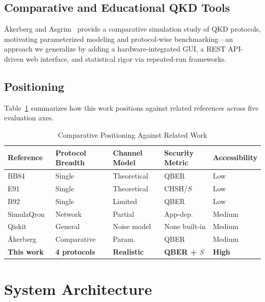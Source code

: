 \documentclass[journal]{IEEEtran}
\begin{document}
\subsection{Comparative and Educational QKD Tools}

\AA kerberg and Asgrim~\cite{akerberg2023} provide a comparative
simulation study of QKD protocols, motivating parameterized modeling
and protocol-wise benchmarking—an approach we generalize by adding
a hardware-integrated GUI, a REST API-driven web interface, and
statistical rigor via repeated-run frameworks.

\subsection{Positioning}

Table~\ref{tab:litcompare} summarizes how this work positions against
related references across five evaluation axes.

\begin{table}[!t]
  \caption{Comparative Positioning Against Related Work}
  \label{tab:litcompare}
  \centering
  \footnotesize
  \begin{tabular}{p{1.4cm}p{1.1cm}p{1.2cm}p{1.2cm}p{1.3cm}}
    \toprule
    Reference & Protocol Breadth & Channel Model & Security Metric & Accessibility \\
    \midrule
    BB84~\cite{bb84}           & Single  & Theoretical & QBER       & Low    \\
    E91~\cite{e91}             & Single  & Theoretical & CHSH/$S$   & Low    \\
    B92~\cite{b92}             & Single  & Limited     & QBER       & Low    \\
    SimulaQron~\cite{simulaqron}& Network & Partial     & App-dep.   & Medium \\
    Qiskit~\cite{qiskit}       & General & Noise model & None built-in & Medium \\
    \AA kerberg~\cite{akerberg2023}& Comparative& Param.& QBER  & Medium \\
    \textbf{This work}         & \textbf{4 protocols} & \textbf{Realistic} & \textbf{QBER + $S$} & \textbf{High} \\
    \bottomrule
  \end{tabular}
\end{table}

\section{System Architecture}
\label{sec:architecture}
\end{document}
